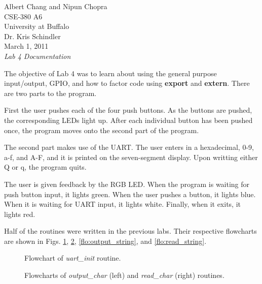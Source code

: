 \documentclass[letterpaper,10pt]{article}
\begin{document}
    Albert Chang and Nipun Chopra\\
    CSE-380 A6\\
    University at Buffalo\\
    Dr. Kris Schindler\\
    March 1, 2011\\
    \textit{Lab 4 Documentation}

    The objective of Lab 4 was to learn about using the general purpose
    input/output, GPIO, and how to factor code using \textbf{export} and
    \textbf{extern}. There are two parts to the program.

    First the user pushes each of the four push buttons. As the buttons are
    pushed, the corresponding LEDs light up. After each individual button has
    been pushed once, the program moves onto the second part of the program.

    The second part makes use of the UART. The user enters in a hexadecimal,
    0-9, a-f, and A-F, and it is printed on the seven-segment display. Upon
    writting either Q or q, the program quits.

    The user is given feedback by the RGB LED. When the program is waiting for
    push button input, it lights green. When the user pushes a button, it
    lights blue. When it is waiting for UART input, it lights white. Finally,
    when it exits, it lights red.

    Half of the routines were written in the previous labs. Their respective
    flowcharts are shown in Figs. \ref{flo:uart_init}, \ref{flo:chars},
    \ref{flo:output_string}, and \ref{flo:read_string}.

    \begin{figure}[p]
        
        \caption{Flowchart of \textit{uart\_init} routine.}
        \label{flo:uart_init}
    \end{figure}

    \begin{figure}[p]
        \begin{minipage}{0.5\linewidth}
            
        \end{minipage}%
        \begin{minipage}{0.5\linewidth}
            
        \end{minipage}
        \caption{Flowcharts of \textit{output\_char} (left) and \textit{read\_char} (right) routines.}
        \label{flo:chars}
    \end{figure}
\end{document}
